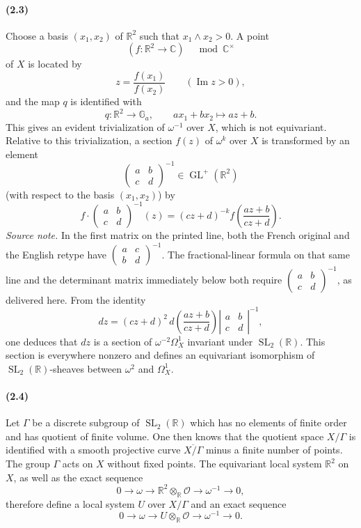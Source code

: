 \documentclass[10pt]{article}
\newcommand{\C}{\mathbb C}
\newcommand{\R}{\mathbb R}
\newcommand{\Ga}{\mathbb G_a}
\newcommand{\GL}{\operatorname{GL}}
\newcommand{\SL}{\operatorname{SL}}
\newcommand{\cO}{\mathcal O}
\begin{document}
\paragraph{(2.3)}
Choose a basis $(x_1,x_2)$ of $\R^2$ such that $x_1\wedge x_2>0$. A point
\[
(f:\R^2\to \C)\quad \bmod \C^\times
\]
of $X$ is located by
\[
z=\frac{f(x_1)}{f(x_2)}\qquad (\operatorname{Im}z>0),
\]
and the map $q$ is identified with
\[
q:\R^2\to\Ga,\qquad ax_1+bx_2\longmapsto az+b.
\]
This gives an evident trivialization of $\omega^{-1}$ over $X$, which is not equivariant.
Relative to this trivialization, a section $f(z)$ of $\omega^k$ over $X$ is transformed by
an element
\[
\begin{pmatrix}a&b\\ c&d\end{pmatrix}^{-1}\in \GL^+(\R^2)
\]
(with respect to the basis $(x_1,x_2)$) by
\[
f\cdot
\begin{pmatrix}a&b\\ c&d\end{pmatrix}^{-1}(z)
=(cz+d)^{-k}f\!\left(\frac{az+b}{cz+d}\right).
\]
\noindent\emph{Source note.} In the first matrix on the printed line, both the French
original and the English retype have
$\left(\begin{smallmatrix}a&c\\ b&d\end{smallmatrix}\right)^{-1}$. The fractional-linear
formula on that same line and the determinant matrix immediately below both require
$\left(\begin{smallmatrix}a&b\\ c&d\end{smallmatrix}\right)^{-1}$, as delivered here.
From the identity
\[
dz=(cz+d)^2\,d\!\left(\frac{az+b}{cz+d}\right)
\left|\begin{matrix}a&b\\ c&d\end{matrix}\right|^{-1},
\]
one deduces that $dz$ is a section of $\omega^{-2}\Omega^1_X$ invariant under
$\SL_2(\R)$. This section is everywhere nonzero and defines an equivariant isomorphism
of $\SL_2(\R)$-sheaves between $\omega^2$ and $\Omega^1_X$.

\paragraph{(2.4)}
Let $\Gamma$ be a discrete subgroup of $\SL_2(\R)$ which has no elements of finite
order and has quotient of finite volume. One then knows that the quotient space $X/\Gamma$
is identified with a smooth projective curve $\overline{X/\Gamma}$ minus a finite number of
points. The group $\Gamma$ acts on $X$ without fixed points. The equivariant local system
$\R^2$ on $X$, as well as the exact sequence
\[
0\to \omega\to \R^2\otimes_\R\cO\to\omega^{-1}\to 0,
\]
therefore define a local system $U$ over $X/\Gamma$ and an exact sequence
\[
0\to \omega\to U\otimes_\R\cO\to\omega^{-1}\to 0.\tag{2.5}
\]
\end{document}
